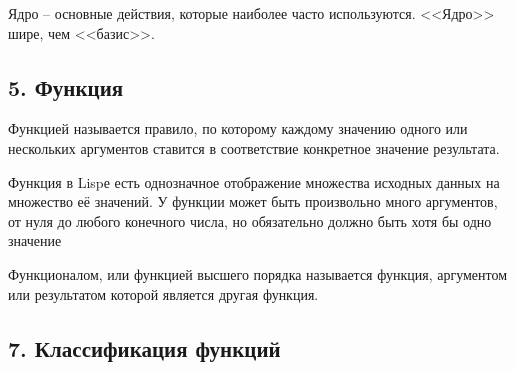 Ядро -- основные действия, которые наиболее часто используются. <<Ядро>> шире, чем <<базис>>.







\subsection*{5. Функция}

Функцией называется правило, по которому каждому значению одного или нескольких аргументов ставится в соответствие конкретное значение результата.

Функция в Lispе есть однозначное отображение множества исходных данных на множество её значений. У функции может быть произвольно много аргументов, от нуля до любого конечного числа, но обязательно должно быть хотя бы одно значение

Функционалом, или функцией высшего порядка называется функция, аргументом или результатом которой является другая функция.


\subsection*{7. Классификация функций}


